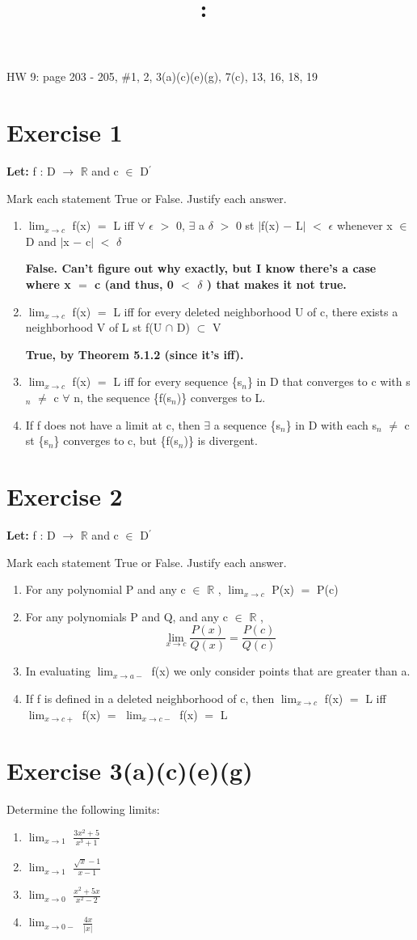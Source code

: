 \documentclass{article}
\title{
    \vspace{2in}
    \textmd{\textbf{\hmwkClass:\ \hmwkTitle}}\\
    \normalsize\vspace{0.1in}\small\vspace{0.1in}\large{\textit{\hmwkClassInstructor}}
    \vspace{3in}
}
\author{\hmwkAuthorName}
\date{}
\newcommand{\mt}[1]{\ensuremath{#1}}
\newcommand\bsc[2][\DefaultOpt]{%
  \def\DefaultOpt{#2}%
  \section[#1]{#2}%
}
\newcommand{\balist}{\begin{enumerate}[label=\alph*.]}
\newcommand{\elist}{\end{enumerate}}
\newcommand{\lt}[1]{\textbf{Let: } #1}
\newcommand{\br}{\mt{\mathbb{R}} }       %
\newcommand{\ep}{\mt{\epsilon} }         %
\newcommand{\fa}{\mt{\forall} }          %
\newcommand{\dta}{\mt{\delta} }
\newcommand{\mem}{\mt{\in} }
\newcommand{\exs}{\mt{\exists} }
\newcommand{\sbs}{\mt{\subset} }         %
\newcommand{\lra}{ \mt{\longrightarrow} } %
\newcommand{\av}[1]{\mt{|}#1\mt{|}}  %
\newcommand{\bk}[1]{\{#1\}}
\newcommand{\ms}{\mt{-} }
\newcommand{\ls}{\mt{<} }
\newcommand{\gr}{\mt{>} }
\newcommand{\eql}{\mt{=} }
\newcommand{\pr}{\mt{^\prime} } 		   %
\newcommand{\uw}[2]{#1\mt{_{#2}}}
\newcommand{\frc}[2]{\mt{\frac{#1}{#2}}}
\newcommand{\limt}[2]{\mt{\displaystyle{\lim_{#1 \to #2}}}}
\newcommand{\eqn}[1]{\[#1\]}
\newcommand{\inn}{\mt{\cap} }
\begin{document}
HW 9: page 203 - 205, \#1, 2, 3(a)(c)(e)(g), 7(c), 13, 16, 18, 19

\bsc{Exercise 1}{

\lt{f : D \lra \br and c \mem D\pr}

Mark each statement True or False. Justify each answer.

\balist
\item \limt{x}{c} f(x) \eql L iff \fa \ep \gr 0, \exs a \dta \gr 0 st \av{f(x) \ms L} \ls \ep whenever x \mem D and \av{x \ms c} \ls \dta
	
	\textbf{False. Can't figure out why exactly, but I know there's a case where x \eql c (and thus, 0 \ls \dta) that makes it not true.}
\item \limt{x}{c} f(x) \eql L iff for every deleted neighborhood U of c, there exists a neighborhood V of L st f(U \inn D) \sbs V

	\textbf{True, by Theorem 5.1.2 (since it's iff).}

\item \limt{x}{c} f(x) \eql L iff for every sequence \bk{\uw{s}{n}} in D that converges to c with \uw{s}{n} $\neq$ c \fa n, the sequence \bk{f(\uw{s}{n})} converges to L.
	
	
\item If f does not have a limit at c, then \exs a sequence \bk{\uw{s}{n}} in D with each \uw{s}{n} $\neq$ c st \bk{\uw{s}{n}} converges to c, but \bk{f(\uw{s}{n})} is divergent.
\elist

}

\bsc{Exercise 2}{
\lt{f : D \lra \br and c \mem D\pr}

Mark each statement True or False. Justify each answer.

\balist
\item For any polynomial P and any c \mem \br, \limt{x}{c} P(x) \eql P(c)
\item For any polynomials P and Q, and any c \mem \br,
	\eqn{\limt{x}{c} \frac{P(x)}{Q(x)} = \frac{P(c)}{Q(c)}}
\item In evaluating \limt{x}{a-} f(x) we only consider points that are greater than a.
\item If f is defined in a deleted neighborhood of c, then \limt{x}{c} f(x) \eql L iff \limt{x}{c+} f(x) \eql \limt{x}{c-} f(x) \eql L
\elist

}

\bsc{Exercise 3(a)(c)(e)(g)}{

Determine the following limits:

\balist
\item \limt{x}{1} \frc{3x^2 + 5}{x^3 + 1}
\item \limt{x}{1} \frc{\sqrt{x} - 1}{x - 1}
\item \limt{x}{0} \frc{x^2 + 5x}{x^2 - 2}
\item \limt{x}{0-} \frc{4x}{\av{x}}
\elist
}
\end{document}
